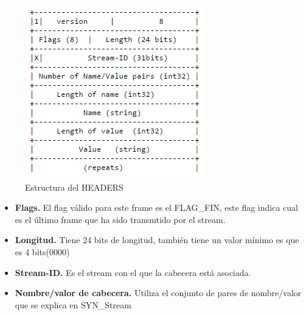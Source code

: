 \begin{figure}[H] %
\includegraphics[scale=1]{headers.png}  %
\centering
\caption{Estructura del HEADERS} \label{fig:figura10}
\end{figure}

\begin{itemize}
 \item \textbf{Flags.} El flag válido para este frame es el FLAG\_FIN, este flag indica cual es el último frame que ha sido transmtido por el stream.
  \item \textbf{Longitud.} Tiene 24 bits de longitud, también tiene un valor mínimo es que es 4 bits(0000)
  \item \textbf{Stream-ID.} Es el stream con el que la cabecera está asociada.
  \item \textbf{Nombre/valor de cabecera.} Utiliza el conjunto de pares de nombre/valor que se explica en SYN\_Stream
\end{itemize}

